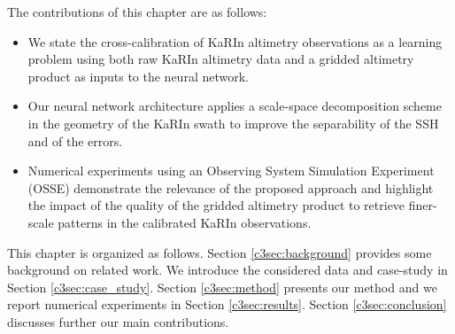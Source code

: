 \begin{bibunit}
The contributions of this chapter are as follows:
\begin{itemize}
\item{We state the cross-calibration of KaRIn altimetry observations as a learning problem using both raw KaRIn altimetry data and a gridded altimetry product as inputs to the neural network.}
\item{Our neural network architecture applies a scale-space decomposition scheme in the geometry of the KaRIn swath to improve the separability of the SSH and of the errors.}
\item{Numerical experiments using an Observing System Simulation Experiment (OSSE) demonstrate the relevance of the proposed approach and highlight the impact of the quality of the gridded altimetry product to retrieve finer-scale patterns in the calibrated KaRIn observations.}
\end{itemize}
This chapter is organized as follows. Section \ref{c3sec:background} provides some background on related work. We introduce the considered data and case-study in Section \ref{c3sec:case_study}. 
Section \ref{c3sec:method} presents our method and we report numerical experiments in Section \ref{c3sec:results}. 
Section \ref{c3sec:conclusion} discusses further our main contributions.


\end{bibunit}
